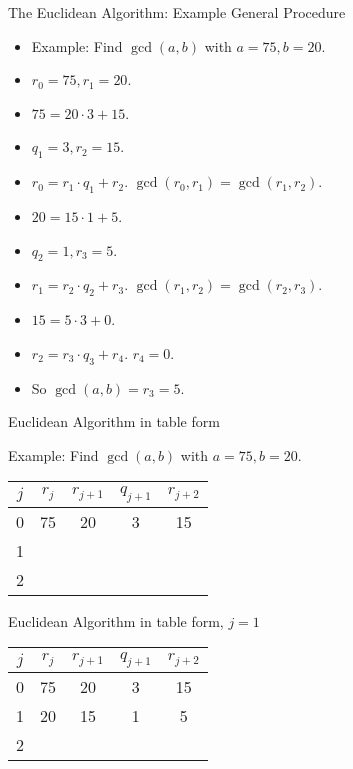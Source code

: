 \documentclass{beamer}
\begin{document}
\begin{frame}{The Euclidean Algorithm: Example General Procedure}

\begin{itemize}
  \item Example: Find $\gcd(a, b)$ with $a=75, b=20$.
  \item $r_0 = 75, r_1 = 20$.
  \item $75 = 20\cdot 3 + 15$.
  \item $q_1 = 3, r_2 = 15$.
  \item $r_0 = r_1 \cdot q_1 + r_2$. $\gcd(r_0, r_1) = \gcd(r_1, r_2)$.
  \item $20 = 15 \cdot 1 + 5$.
  \item $q_2 = 1, r_3 = 5$.
  \item $r_1 = r_2 \cdot q_2 + r_3$. $\gcd(r_1, r_2) = \gcd(r_2, r_3)$.
  \item $15 = 5 \cdot 3 + 0$.
  \item $r_2 = r_3 \cdot q_3 + r_4$. $r_4 = 0$.
  \item So $\gcd(a,b) = r_3 = 5$.
\end{itemize}

\end{frame}


\begin{frame}{Euclidean Algorithm in table form}

Example: Find $\gcd(a, b)$ with $a=75, b=20$.

\begin{tabular}{|c|c|c|c|c|}\hline
$j$   &  $r_{j}$    & $r_{j+1}$ & $q_{j+1}$ & $r_{j+2}$ \\ \hline\hline
0     &  75         &  20       &    3      &   15      \\ \hline
1     &             &           &           &           \\ \hline
2     &             &           &           &           \\ \hline
\end{tabular}

\end{frame}

\begin{frame}{Euclidean Algorithm in table form, $j=1$}

\begin{tabular}{|c|c|c|c|c|}\hline
$j$   &  $r_{j}$    & $r_{j+1}$ & $q_{j+1}$ & $r_{j+2}$ \\ \hline\hline
0     &  75         &  20       &    3      &   15      \\ \hline
1     &  20         &  15       &    1      &   5       \\ \hline
2     &             &           &           &           \\ \hline
\end{tabular}

\end{frame}
\end{document}
